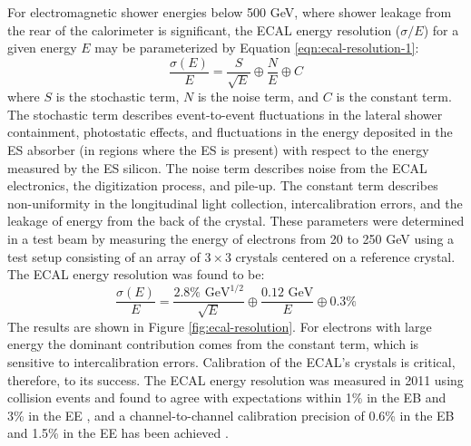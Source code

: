 For electromagnetic shower energies below 500 GeV, where shower leakage from the rear of the 
calorimeter is significant, the ECAL energy resolution 
($\sigma/E$) for a given energy $E$ may be parameterized by 
Equation \ref{eqn:ecal-resolution-1}:
\begin{equation}
  \frac{\sigma(E)}{E} =
  \frac{S}{\sqrt{E}} \oplus
  \frac{N}{E}        \oplus  C
  \label{eqn:ecal-resolution-1}
\end{equation}
where $S$ is the stochastic term,
$N$ is the noise term, and 
$C$ is the constant term.
The stochastic term describes event-to-event fluctuations
in the lateral shower containment, photostatic effects,
and fluctuations in the energy deposited in the ES
absorber (in regions where the ES is present) with respect
to the energy measured by the ES silicon.
The noise term describes noise from the ECAL electronics, the digitization process,
and pile-up.
The constant term describes non-uniformity in the longitudinal light collection,
intercalibration errors, and the leakage of energy from the back of the crystal.
These parameters were determined in a test beam by measuring the energy 
of electrons from 20 to 250 GeV using a test setup consisting of an array of 
$3\times3$ crystals centered on a reference crystal.  The ECAL energy resolution was found to be:
\begin{equation}
  \frac{\sigma(E)}{E} =
  \frac{2.8\% \text{ GeV}^{1/2}}{\sqrt{E}} \oplus
  \frac{0.12\text{ GeV}}{E} \oplus 0.3\%
  \label{eqn:ecal-resolution-2}
\end{equation}
The results are shown in Figure \ref{fig:ecal-resolution}.
For electrons with large energy the dominant contribution 
comes from the constant term, which is sensitive to intercalibration errors.
Calibration of the ECAL's crystals is critical, therefore, to its success.
The ECAL energy resolution was measured in 2011 using collision events and 
found to agree with expectations within 1\% in the EB and 3\% in the EE \cite{EES}, 
and a channel-to-channel calibration precision of 0.6\% in the EB and 1.5\% in the EE
has been achieved \cite{ecal-resolution}.

